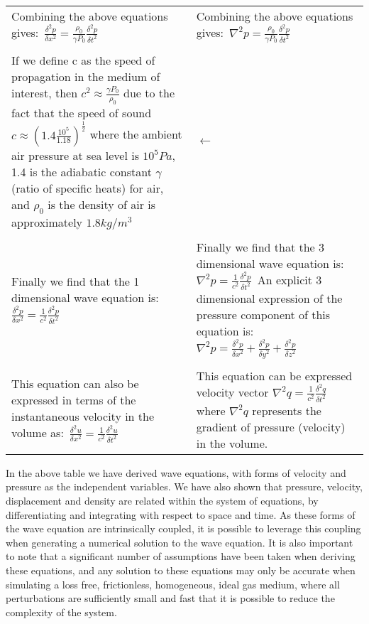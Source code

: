 \begin{center}
\begin{longtable}{|p{}|p{}|}
\\
Combining the above equations gives:\ $\frac{\delta^2 p}{\delta x^2}=\frac{\rho_0}{\gamma P_0}\frac{\delta^2 p}{\delta t^2} $ & Combining the above equations gives:\ $\nabla^2 p = \frac{\rho_0}{\gamma P_0}\frac{\delta^2 p}{\delta t^2}$ \\
\\
If we define c as the speed of propagation in the medium of interest, then $c^2\approx \frac{\gamma P_0}{\rho_0}$ due to the fact that the speed of sound $c \approx (1.4\frac{10^5}{1.18})^\frac{1}{2}$ where the ambient air pressure at sea level is $10^5Pa$, 1.4 is the adiabatic constant $\gamma$ (ratio of specific heats) for air, and $\rho_0$ is the density of air is approximately $1.8kg/m^3 $   & $\leftarrow$ \\
\\
Finally we find that the 1 dimensional wave equation is:\ $\frac{\delta^2 p}{\delta x^2}=\frac{1}{c^2}\frac{\delta^2 p}{\delta t^2}$ & Finally we find that the 3 dimensional wave equation is:\ $\nabla^2 p = \frac{1}{c^2}\frac{\delta^2 p}{\delta t^2}$\ An explicit 3 dimensional expression of the pressure component of this equation is:\ $\nabla^2 p = \frac{\delta^2p}{\delta x^2}+\frac{\delta^2p}{\delta y^2}+\frac{\delta^2p}{\delta z^2}$ \\
\\
This equation can also be expressed in terms of the instantaneous velocity in the volume as:\ $\frac{\delta^2 u}{\delta x^2}=\frac{1}{c^2}\frac{\delta^2 u}{\delta t^2}$ & This equation can be expressed velocity vector $\nabla^2 q = \frac{1}{c^2}\frac{\delta^2 q}{\delta t^2}$ where $\nabla^2 q$ represents the gradient of pressure (velocity) in the volume.\\
\hline
\end{longtable}
\end{center}

In the above table we have derived wave equations, with forms of velocity and pressure as the independent variables. We have also shown that pressure, velocity, displacement and density are related within the system of equations, by differentiating and integrating with respect to space and time. As these forms of the wave equation are intrinsically coupled, it is possible to leverage this coupling when generating a numerical solution to the wave equation. It is also important to note that a significant number of assumptions have been taken when deriving these equations, and any solution to these equations may only be accurate when simulating a loss free, frictionless, homogeneous, ideal gas medium, where all perturbations are sufficiently small and fast that it is possible to reduce the complexity of the system.